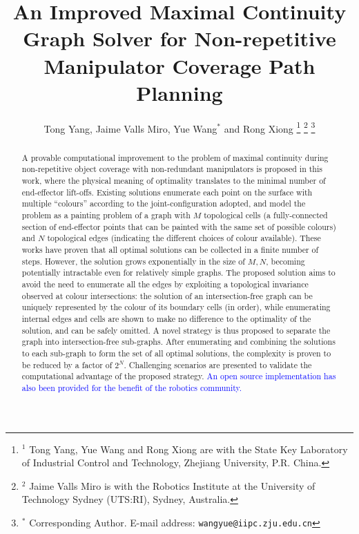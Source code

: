 \documentclass[journal]{IEEEtran}
\begin{document}
\title{An Improved Maximal Continuity Graph Solver for Non-repetitive Manipulator Coverage Path Planning} %

\author{Tong Yang, Jaime Valls Miro, Yue Wang$^*$ and Rong Xiong
\thanks{$^1$ Tong Yang, Yue Wang and Rong Xiong are with the State Key 
Laboratory of Industrial Control and Technology, Zhejiang University, P.R. China. 
}
\thanks{$^2$ Jaime Valls Miro is with the Robotics Institute at the University of Technology Sydney (UTS:RI), Sydney, Australia.}
\thanks{$^*$ Corresponding Author. \newline \indent
E-mail address: {\tt\small wangyue@iipc.zju.edu.cn}}
}

\maketitle

\begin{abstract}
A provable computational improvement to the problem of maximal continuity during non-repetitive object coverage with non-redundant manipulators is proposed in this work, where the physical meaning of optimality translates to the minimal number of end-effector lift-offs. Existing solutions enumerate each point on the surface with multiple ``colours'' according to the joint-configuration adopted, and model the problem as a painting problem of a graph with $M$ topological cells (a fully-connected section of end-effector points that can be painted with the same set of possible colours) and $N$ topological edges
(indicating the different choices of colour available). 
These works have proven that all optimal solutions can be collected in a finite number of steps. However, the solution grows exponentially in the size of $M, N$, becoming potentially intractable even for relatively simple graphs.
The proposed solution aims to avoid the need to enumerate all 
the edges by exploiting a topological invariance observed at colour intersections: 
the solution of an intersection-free graph can be uniquely represented by the colour of its boundary cells (in order), while enumerating internal edges and cells 
are shown to make no difference to the optimality of the solution, and can be safely omitted. 
A novel strategy is thus proposed to separate the graph into intersection-free sub-graphs.  
After enumerating and combining the solutions to each sub-graph to form the set of all optimal solutions, 
the complexity is proven to be reduced by a factor of $2^N$. Challenging scenarios are presented to validate the computational advantage of the proposed strategy.
\textcolor{blue}{An open source implementation has also been provided for the benefit of the robotics community. }
\end{abstract}
\end{document}
